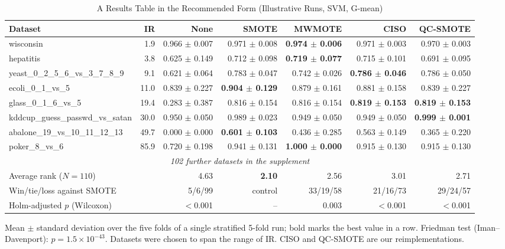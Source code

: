 \begin{table}[t]
  \caption{A Results Table in the Recommended Form (Illustrative Runs, SVM, G-mean)}
  \label{tab:empirical-example}
  \scriptsize
  \setlength{\tabcolsep}{3pt}
  \begin{tabular}{@{}lrrrrrr@{}}
    \toprule
    Dataset & IR & None & SMOTE & MWMOTE & CISO & QC-SMOTE\\
    \midrule
    wisconsin & 1.9 & 0.966 $\pm$ 0.007 & 0.971 $\pm$ 0.008 & \textbf{0.974 $\pm$ 0.006} & 0.971 $\pm$ 0.003 & 0.970 $\pm$ 0.003\\
    hepatitis & 3.8 & 0.625 $\pm$ 0.149 & 0.712 $\pm$ 0.098 & \textbf{0.719 $\pm$ 0.077} & 0.715 $\pm$ 0.101 & 0.691 $\pm$ 0.095\\
    yeast\_0\_2\_5\_6\_vs\_3\_7\_8\_9 & 9.1 & 0.621 $\pm$ 0.064 & 0.783 $\pm$ 0.047 & 0.742 $\pm$ 0.026 & \textbf{0.786 $\pm$ 0.046} & 0.786 $\pm$ 0.050\\
    ecoli\_0\_1\_vs\_5 & 11.0 & 0.839 $\pm$ 0.227 & \textbf{0.904 $\pm$ 0.129} & 0.879 $\pm$ 0.161 & 0.881 $\pm$ 0.158 & 0.839 $\pm$ 0.227\\
    glass\_0\_1\_6\_vs\_5 & 19.4 & 0.283 $\pm$ 0.387 & 0.816 $\pm$ 0.154 & 0.816 $\pm$ 0.154 & \textbf{0.819 $\pm$ 0.153} & \textbf{0.819 $\pm$ 0.153}\\
    kddcup\_guess\_passwd\_vs\_satan & 30.0 & 0.950 $\pm$ 0.050 & 0.989 $\pm$ 0.023 & 0.949 $\pm$ 0.050 & 0.949 $\pm$ 0.050 & \textbf{0.999 $\pm$ 0.001}\\
    abalone\_19\_vs\_10\_11\_12\_13 & 49.7 & 0.000 $\pm$ 0.000 & \textbf{0.601 $\pm$ 0.103} & 0.436 $\pm$ 0.285 & 0.563 $\pm$ 0.149 & 0.365 $\pm$ 0.220\\
    poker\_8\_vs\_6 & 85.9 & 0.720 $\pm$ 0.198 & 0.941 $\pm$ 0.131 & \textbf{1.000 $\pm$ 0.000} & 0.915 $\pm$ 0.130 & 0.915 $\pm$ 0.130\\
    \multicolumn{7}{c}{\textit{102 further datasets in the supplement}}\\
    \midrule
    Average rank ($N = 110$) & & 4.63 & \textbf{2.10} & 2.56 & 3.01 & 2.71\\
    Win/tie/loss against SMOTE & & 5/6/99 & control & 33/19/58 & 21/16/73 & 29/24/57\\
    Holm-adjusted $p$ (Wilcoxon) & & $<$0.001 & -- & 0.003 & $<$0.001 & $<$0.001\\
    \bottomrule
  \end{tabular}
  \par\smallskip\raggedright\scriptsize Mean $\pm$ standard deviation over the five folds of a single stratified 5-fold run; bold marks the best value in a row. Friedman test (Iman--Davenport): $p = 1.5 \times 10^{-43}$. Datasets were chosen to span the range of IR. CISO and QC-SMOTE are our reimplementations.
\end{table}
